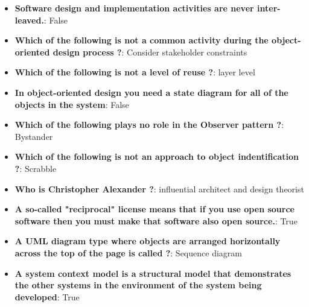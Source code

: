\documentclass{report}
\begin{document}
    \pagebreak 
    \begin{itemize}
        \item \textbf{Software design and implementation activities are never inter-leaved.}: False
        \item \textbf{Which of the following is not a common activity during the object-oriented design process ?}: Consider stakeholder constraints
        \item \textbf{Which of the following is not a level of reuse ?}: layer level
        \item \textbf{In object-oriented design you need a state diagram for all of the objects in the system}: False
        \item \textbf{Which of the following plays no role in the Observer pattern ?}: Bystander
        \item \textbf{Which of the following is not an approach to object indentification ?}: Scrabble
        \item \textbf{Who is Christopher Alexander ?}: influential architect and design theorist
        \item \textbf{A so-called "reciprocal" license means that if you use open source software then you must make that software also open source.}: True
        \item \textbf{A UML diagram type where objects are arranged horizontally across the top of the page is called ?}: Sequence diagram
        \item \textbf{A system context model is a structural model that demonstrates the other systems in the environment of the system being developed}: True
    \end{itemize}
    
\end{document}
